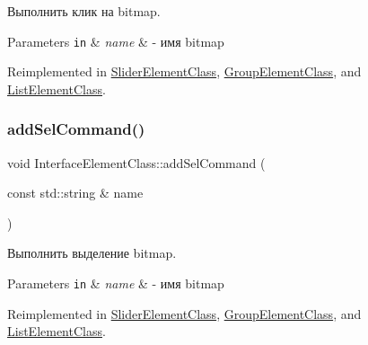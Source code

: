 Выполнить клик на bitmap. 


\begin{DoxyParams}[1]{Parameters}
\mbox{\tt in}  & {\em name} & -\/ имя bitmap \\
\hline
\end{DoxyParams}


Reimplemented in \hyperlink{class_slider_element_class_a2466f36f541259a81c690b366ca66bd4}{Slider\+Element\+Class}, \hyperlink{class_group_element_class_a4c6f9a1a30f7998884e90049e9532689}{Group\+Element\+Class}, and \hyperlink{class_list_element_class_afa7a26828a046b781f52255b78a4ba2e}{List\+Element\+Class}.

\mbox{\label{class_interface_element_class_a47b6374245f1b3a2c56366b8819f1569}} 
\subsubsection{\texorpdfstring{add\+Sel\+Command()}{addSelCommand()}}
{\footnotesize\ttfamily void Interface\+Element\+Class\+::add\+Sel\+Command (\begin{DoxyParamCaption}\item[{const std\+::string \&}]{name }\end{DoxyParamCaption})\hspace{0.3cm}{\ttfamily [virtual]}}



Выполнить выделение bitmap. 


\begin{DoxyParams}[1]{Parameters}
\mbox{\tt in}  & {\em name} & -\/ имя bitmap \\
\hline
\end{DoxyParams}


Reimplemented in \hyperlink{class_slider_element_class_a37d2eff7e6d2a0f2c0cd628dafb096e5}{Slider\+Element\+Class}, \hyperlink{class_group_element_class_a09a79779143779b0c6e5088bbdbed8ca}{Group\+Element\+Class}, and \hyperlink{class_list_element_class_ad76028165b37c10e2315fa0c678d51fc}{List\+Element\+Class}.

\mbox{\label{class_interface_element_class_a318c70a834096462e9ed764f32fe3065}} 
